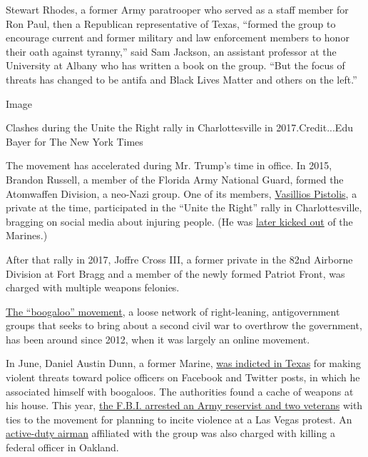 Stewart Rhodes, a former Army paratrooper who served as a staff member
for Ron Paul, then a Republican representative of Texas, ``formed the
group to encourage current and former military and law enforcement
members to honor their oath against tyranny,'' said Sam Jackson, an
assistant professor at the University at Albany who has written a book
on the group. ``But the focus of threats has changed to be antifa and
Black Lives Matter and others on the left.''

Image

Clashes during the Unite the Right rally in Charlottesville in
2017.Credit...Edu Bayer for The New York Times

The movement has accelerated during Mr. Trump's time in office. In 2015,
Brandon Russell, a member of the Florida Army National Guard, formed the
Atomwaffen Division, a neo-Nazi group. One of its members,
\href{https://www.marinecorpstimes.com/news/your-marine-corps/2019/09/04/the-neo-nazi-boot-inside-one-marines-descent-into-extremism/}{Vasillios
Pistolis}, a private at the time, participated in the ``Unite the
Right'' rally in Charlottesville, bragging on social media about
injuring people. (He was
\href{https://www.marinecorpstimes.com/news/your-marine-corps/2019/09/04/the-neo-nazi-boot-inside-one-marines-descent-into-extremism/}{later
kicked out} of the Marines.)

After that rally in 2017, Joffre Cross III, a former private in the 82nd
Airborne Division at Fort Bragg and a member of the newly formed Patriot
Front, was charged with multiple weapons felonies.

\href{https://www.theatlantic.com/technology/archive/2020/07/american-boogaloo-meme-or-terrorist-movement/613843/}{The
``boogaloo'' movement}, a loose network of right-leaning, antigovernment
groups that seeks to bring about a second civil war to overthrow the
government, has been around since 2012, when it was largely an online
movement.

In June, Daniel Austin Dunn, a former Marine,
\href{https://int.graylady3jvrrxbe.onion/data/documenttools/dunn-indictment/a97279ae6811af57/full.pdf}{was
indicted in Texas} for making violent threats toward police officers on
Facebook and Twitter posts, in which he associated himself with
boogaloos. The authorities found a cache of weapons at his house. This
year,
\href{https://www.militarytimes.com/news/your-military/2020/06/04/army-reservist-navy-and-air-force-vets-plotted-to-terrorize-vegas-protests-prosecutors-charge/}{the
F.B.I. arrested an Army reservist and two veterans} with ties to the
movement for planning to incite violence at a Las Vegas protest. An
\href{https://www.airforcetimes.com/news/your-air-force/2020/06/16/air-force-sergeant-charged-in-killing-of-federal-officer-in-california/}{active-duty
airman} affiliated with the group was also charged with killing a
federal officer in Oakland.

